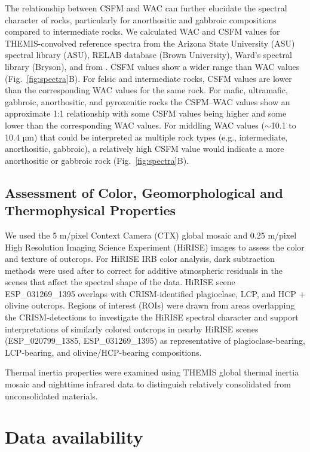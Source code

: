 \documentclass[12pt]{article}
\begin{document}
The relationship between CSFM and WAC can further elucidate the spectral character of rocks, particularly for anorthositic and gabbroic compositions compared to intermediate rocks. We calculated WAC and CSFM values for THEMIS-convolved reference spectra from the Arizona State University (ASU) spectral library (ASU), RELAB database (Brown University), Ward's spectral library (Bryson), and from \citet{Dunn2021}. CSFM values show a wider range than WAC values (Fig.~\ref{fig:spectra}B). For felsic and intermediate rocks, CSFM values are lower than the corresponding WAC values for the same rock. For mafic, ultramafic, gabbroic, anorthositic, and pyroxenitic rocks the CSFM--WAC values show an approximate 1:1 relationship with some CSFM values being higher and some lower than the corresponding WAC values. For middling WAC values ($\sim$10.1 to 10.4 µm) that could be interpreted as multiple rock types (e.g., intermediate, anorthositic, gabbroic), a relatively high CSFM value would indicate a more anorthositic or gabbroic rock (Fig.~\ref{fig:spectra}B).

\subsection*{Assessment of Color, Geomorphological and Thermophysical Properties}

We used the 5 m/pixel Context Camera (CTX) global mosaic \citep{Malin2007, Dickson2018} and 0.25 m/pixel High Resolution Imaging Science Experiment (HiRISE) images \citep{McEwen2010} to assess the color and texture of outcrops. For HiRISE IRB color analysis, dark subtraction methods were used after \citet{Tornabene2018} to correct for additive atmospheric residuals in the scenes that affect the spectral shape of the data. HiRISE scene ESP\_031269\_1395 overlaps with CRISM-identified plagioclase, LCP, and HCP + olivine outcrops. Regions of interest (ROIs) were drawn from areas overlapping the CRISM-detections to investigate the HiRISE spectral character and support interpretations of similarly colored outcrops in nearby HiRISE scenes (ESP\_020799\_1385, ESP\_031269\_1395) as representative of plagioclase-bearing, LCP-bearing, and olivine/HCP-bearing compositions.

Thermal inertia properties were examined using THEMIS global thermal inertia mosaic \citep{Fergason2006, Edwards2009} and nighttime infrared data \citep{Edwards2011} to distinguish relatively consolidated from unconsolidated materials.

\section*{Data availability}
\end{document}
